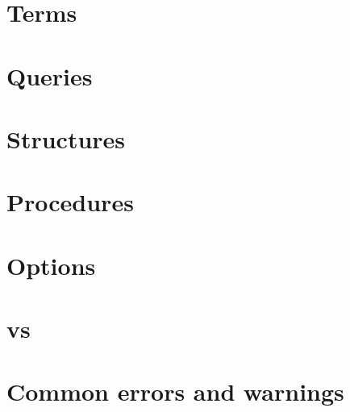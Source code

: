 \documentclass[a4]{article}
\begin{document}
\section{Terms}


\section{Queries}


\section{Structures}


\section{Procedures}


\section{Options}


\section{\idptwo vs \idpthree}


\section{Common errors and warnings}

\end{document}
